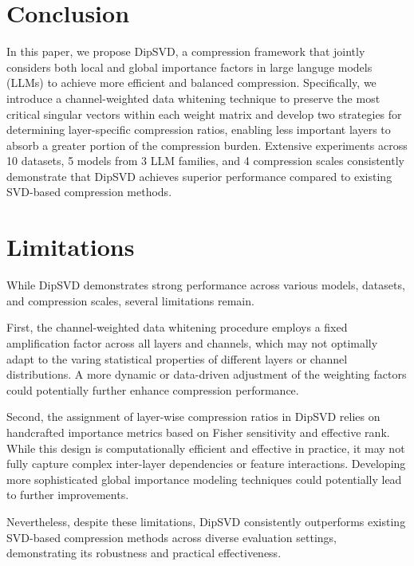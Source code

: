 \documentclass[11pt]{article}
\begin{document}
\section{Conclusion}
In this paper, we propose DipSVD, a compression framework that jointly considers both local and global importance factors in large languge models (LLMs) to achieve more efficient and balanced compression. Specifically, we introduce a channel-weighted data whitening technique to preserve the most critical singular vectors within each weight matrix and develop two strategies for determining layer-specific compression ratios, enabling less important layers to absorb a greater portion of the compression burden. Extensive experiments across 10 datasets, 5 models from 3 LLM families, and 4 compression scales consistently demonstrate that DipSVD achieves superior performance compared to existing SVD-based compression methods.



\section*{Limitations}

While DipSVD demonstrates strong performance across various models, datasets, and compression scales, several limitations remain. 

First, the channel-weighted data whitening procedure employs a fixed amplification factor across all layers and channels, which may not optimally adapt to the varing statistical properties of different layers or channel distributions. A more dynamic or data-driven adjustment of the weighting factors could potentially further enhance compression performance.

Second, the assignment of layer-wise compression ratios in DipSVD relies on handcrafted importance metrics based on Fisher sensitivity and effective rank. While this design is computationally efficient and effective in practice, it may not fully capture complex inter-layer dependencies or feature interactions. Developing more sophisticated global importance modeling techniques could potentially lead to further improvements.

Nevertheless, despite these limitations, DipSVD consistently outperforms existing SVD-based compression methods across diverse evaluation settings, demonstrating its robustness and practical effectiveness.

\end{document}
